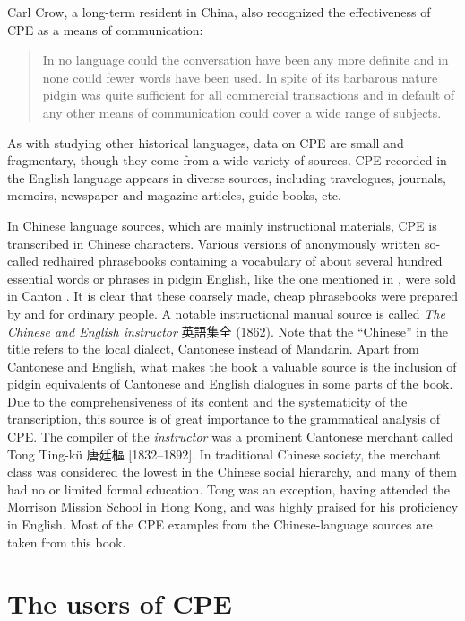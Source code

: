 \documentclass[output=paper]{langsci/langscibook}
\begin{document}
Carl Crow, a long-term resident in China, also recognized the effectiveness of CPE as a means of communication:

\begin{quote}
    In no language could the conversation have been any more definite and in none could fewer words have been used. In spite of its barbarous nature pidgin was quite sufficient for all commercial transactions and in default of any other means of communication could cover a wide range of subjects. \citep[31]{crow_foreign_2011}
\end{quote}

As with studying other historical languages, data on CPE are small and fragmentary, though they come from a wide variety of sources. CPE recorded in the English language appears in diverse sources, including travelogues, journals, memoirs, newspaper and magazine articles, guide books, etc.

In Chinese language sources, which are mainly instructional materials, CPE is transcribed in Chinese characters. Various versions of anonymously written so-called redhaired phrasebooks containing a vocabulary of about several hundred essential words or phrases in pidgin English, like the one mentioned in \citet{hunter_fan_1882}, were sold in Canton \citep{bolton_chinese_2003}. It is clear that these coarsely made, cheap phrasebooks were prepared by and for ordinary people. A notable instructional manual source is called \textit{The Chinese and English instructor} {\cjkfont 英語集全} (1862). Note that the “Chinese” in the title refers to the local dialect, Cantonese instead of Mandarin. Apart from Cantonese and English, what makes the book a valuable source is the inclusion of pidgin equivalents of Cantonese and English dialogues in some parts of the book. Due to the comprehensiveness of its content and the systematicity of the transcription, this source is of great importance to the grammatical analysis of CPE. The compiler of the \textit{instructor} was a prominent Cantonese merchant called Tong Ting-kü {\cjkfont 唐廷樞} [1832--1892]. In traditional Chinese society, the merchant class was considered the lowest in the Chinese social hierarchy, and many of them had no or limited formal education. Tong was an exception, having attended the Morrison Mission School in Hong Kong, and was highly praised for his proficiency in English. Most of the CPE examples from the Chinese-language sources are taken from this book.

\section{The users of CPE}\label{sec:7:4}
\end{document}
